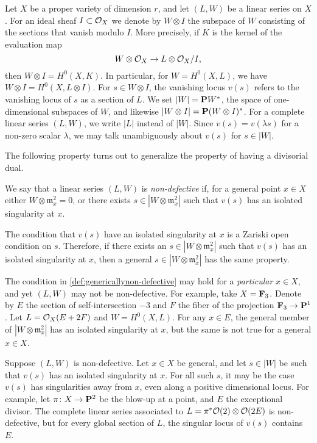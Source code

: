 Let $X$ be a proper variety of dimension $r$, and let $(L, W)$ be a linear series on $X$.
For an ideal sheaf $I \subset \O_X$ we denote by $W \otimes I$ the subspace of $W$ consisting of the sections that vanish modulo $I$. %
More precisely, if $K$ is the kernel of the evaluation map
\[ W \otimes \O_X \to L \otimes \O_X/I,\]
then $W \otimes I = H^0(X, K)$.
In particular, for $W = H^0(X, L)$, we have $W \otimes I = H^0(X, L \otimes I)$.
For $s \in W \otimes I$, the vanishing locus $v(s)$ refers to the vanishing locus of $s$ as a section of $L$.
We set $|W| = \P W^*$, the space of one-dimensional subspaces of $W$, and likewise $|W \otimes I| = \P (W \otimes I)^*$.
For a complete linear series $(L, W)$, we write $|L|$ instead of $|W|$.
Since $v(s) = v(\lambda s)$ for a non-zero scalar $\lambda$, we may talk unambiguously about $v(s)$ for $s \in |W|$.

The following property turns out to generalize the property of having a divisorial dual.
\begin{definition}
  \label{def:genericallynon-defective} 
  We say that a linear series $(L, W)$ is \emph{non-defective} if,  for a general point $x \in X$ either $W \otimes \mathfrak m_x^2 = 0$, or there exists $s \in |W \otimes \mathfrak m_x^2|$ such that $v(s)$ has an isolated singularity at $x$.
\end{definition}
The condition that $v(s)$ have an isolated singularity at $x$ is a Zariski open condition on $s$.
Therefore, if there exists an $s \in |W \otimes \mathfrak m_x^2|$ such that $v(s)$ has an isolated singularity at $x$, then a general $s \in |W \otimes \mathfrak m_x^2|$ has the same property.
\begin{remark}
  The condition in \autoref{def:genericallynon-defective} may hold for a \emph{particular} $x \in X$, and yet $(L, W)$ may not be non-defective.
  For example, take $X = \F_3$.
  Denote by $E$ the section of self-intersection $-3$ and $F$ the fiber of the projection $\F_3 \to \P^1$.
  Let $L = \O_X(E + 2F)$ and $W = H^0(X, L)$.
  For any $x \in E$, the general member of $|W \otimes \mathfrak m_x^2|$ has an isolated singularity at $x$, but the same is not true for a general $x \in X$.
\end{remark}

\begin{remark}
  Suppose $(L, W)$ is non-defective.
  Let $x \in X$ be general, and let $s \in |W|$ be such that $v(s)$ has an isolated singularity at $x$.
  For all such $s$, it may be the case $v(s)$ has singularities away from $x$, even along a positive dimensional locus.
  For example, let $\pi \from X \to \P^2$  be the blow-up at a point, and $E$ the exceptional divisor.
  The complete linear series associated to $L = \pi^* \O(2) \otimes \O(2E)$ is non-defective, but for every global section of $L$, the singular locus of $v(s)$ contains $E$.
\end{remark}


